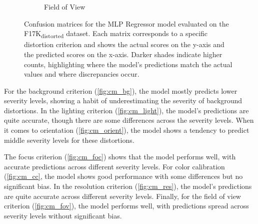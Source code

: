 \begin{figure}[ht]
\begin{subfigure}[b]{0.24\textwidth}
        \caption{Field of View}
        \label{fig:cm_fov}
    \end{subfigure}
    \caption{Confusion matrices for the MLP Regressor model evaluated on the F17K\textsubscript{distorted} dataset. Each matrix corresponds to a specific distortion criterion and shows the actual scores on the y-axis and the predicted scores on the x-axis. Darker shades indicate higher counts, highlighting where the model's predictions match the actual values and where discrepancies occur.}
    \label{fig:confusion_matrices}
\end{figure}
\noindent
For the background criterion (\autoref{fig:cm_bg}), the model mostly predicts lower severity levels, showing a habit of underestimating the severity of background distortions. In the lighting criterion (\autoref{fig:cm_light}), the model’s predictions are quite accurate, though there are some differences across the severity levels. When it comes to orientation (\autoref{fig:cm_orient}), the model shows a tendency to predict middle severity levels for these distortions. \par
\vspace{\baselineskip}
\noindent
The focus criterion (\autoref{fig:cm_foc}) shows that the model performs well, with accurate predictions across different severity levels. For color calibration (\autoref{fig:cm_cc}, the model shows good performance with some differences but no significant bias. In the resolution criterion (\autoref{fig:cm_res}), the model’s predictions are quite accurate across different severity levels. Finally, for the field of view criterion (\autoref{fig:cm_fov}), the model performs well, with predictions spread across severity levels without significant bias. \par

\clearpage
